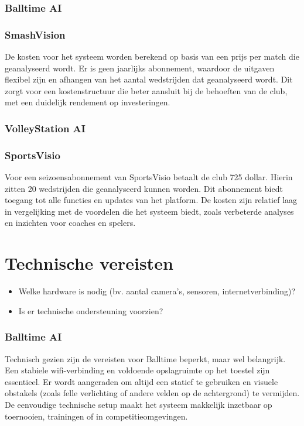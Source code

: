 \subsubsection{Balltime AI}

\subsubsection{SmashVision}
De kosten voor het systeem worden berekend op basis van een prijs per match die geanalyseerd wordt. Er is geen jaarlijks abonnement, waardoor de uitgaven flexibel zijn en afhangen van het aantal wedstrijden dat geanalyseerd wordt. Dit zorgt voor een kostenstructuur die beter aansluit bij de behoeften van de club, met een duidelijk rendement op investeringen.
\subsubsection{VolleyStation AI}

\subsubsection{SportsVisio}
Voor een seizoensabonnement van SportsVisio betaalt de club 725 dollar. Hierin zitten 20 wedstrijden die geanalyseerd kunnen worden. Dit abonnement biedt toegang tot alle functies en updates van het platform. De kosten zijn relatief laag in vergelijking met de voordelen die het systeem biedt, zoals verbeterde analyses en inzichten voor coaches en spelers.

\section{Technische vereisten}
\begin{itemize}
  \item Welke hardware is nodig (bv. aantal camera’s, sensoren, internetverbinding)?
  \item Is er technische ondersteuning voorzien?
\end{itemize}
\subsubsection{Balltime AI}
Technisch gezien zijn de vereisten voor Balltime beperkt, maar wel belangrijk. Een stabiele wifi-verbinding en voldoende opslagruimte op het toestel zijn essentieel. Er wordt aangeraden om altijd een statief te gebruiken en visuele obstakels (zoals felle verlichting of andere velden op de achtergrond) te vermijden. De eenvoudige technische setup maakt het systeem makkelijk inzetbaar op toernooien, trainingen of in competitieomgevingen.
